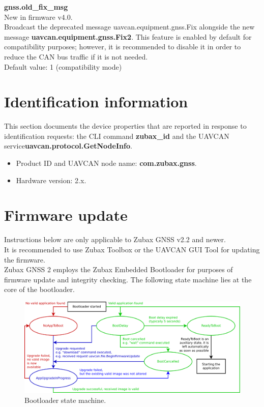 \documentclass{zubaxdoc}
\begin{document}
\textbf{gnss.old{\_}fix{\_}msg}\\
New in firmware v4.0.\\
Broadcast the deprecated message uavcan.equipment.gnss.Fix alongside the new message \textbf{uavcan.equipment.gnss.Fix2}. This feature is enabled by default for compatibility purposes; however, it is recommended to disable it in order to reduce the CAN bus traffic if it is not needed.\\
Default value: 1 (compatibility mode)

\chapter{Identification information}

This section documents the device properties that are reported in response to identification requests: the CLI command \textbf{zubax{\_}id} and the UAVCAN service\textbf{uavcan.protocol.GetNodeInfo}.
\begin{itemize}
\item Product ID and UAVCAN node name: \textbf{com.zubax.gnss}.
\item Hardware version: 2.x.
\end{itemize}

\chapter{Firmware update}
Instructions below are only applicable to Zubax GNSS v2.2 and newer.\\
It is recommended to use Zubax Toolbox or the UAVCAN GUI Tool for updating the firmware.\\
Zubax GNSS 2 employs the Zubax Embedded Bootloader for purposes of firmware update and integrity checking. The following state machine lies at the core of the bootloader.

\begin{figure}[!hbt]
	\centerline{\includegraphics[width=1.1\textwidth]{bootloader_state_machine}}
	\caption{Bootloader state machine.\label{drawing}}
\end{figure}
\end{document}
